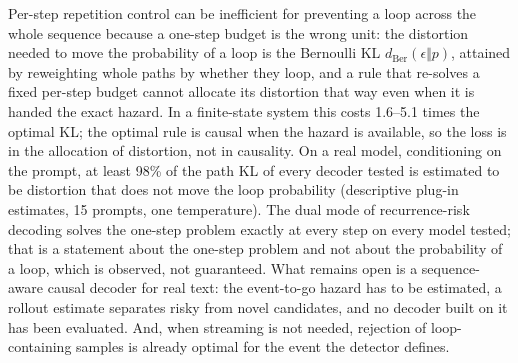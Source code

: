 \documentclass[11pt]{article}
\begin{document}
Per-step repetition control can be inefficient for preventing a loop across the whole sequence because a one-step budget is the wrong unit: the distortion needed to move the probability of a loop is the Bernoulli KL $d_{\mathrm{Ber}}(\epsilon\Vert p)$, attained by reweighting whole paths by whether they loop, and a rule that re-solves a fixed per-step budget cannot allocate its distortion that way even when it is handed the exact hazard. In a finite-state system this costs 1.6--5.1 times the optimal KL; the optimal rule is causal when the hazard is available, so the loss is in the allocation of distortion, not in causality. On a real model, conditioning on the prompt, at least 98\% of the path KL of every decoder tested is estimated to be distortion that does not move the loop probability (descriptive plug-in estimates, 15 prompts, one temperature). The dual mode of recurrence-risk decoding solves the one-step problem exactly at every step on every model tested; that is a statement about the one-step problem and not about the probability of a loop, which is observed, not guaranteed. What remains open is a sequence-aware causal decoder for real text: the event-to-go hazard has to be estimated, a rollout estimate separates risky from novel candidates, and no decoder built on it has been evaluated. And, when streaming is not needed, rejection of loop-containing samples is already optimal for the event the detector defines.
\end{document}
